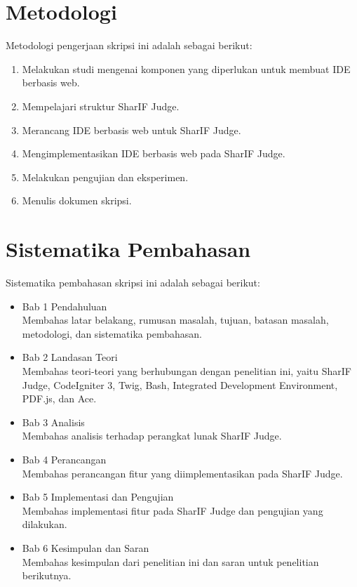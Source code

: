 \section{Metodologi}
\label{sec:metlit}
Metodologi pengerjaan skripsi ini adalah sebagai berikut:
\begin{enumerate}
	\item Melakukan studi mengenai komponen yang diperlukan untuk membuat IDE berbasis web.
	\item Mempelajari struktur SharIF Judge.
	\item Merancang IDE berbasis web untuk SharIF Judge.
	\item Mengimplementasikan IDE berbasis web pada SharIF Judge.
	\item Melakukan pengujian dan eksperimen.
	\item Menulis dokumen skripsi.
\end{enumerate}

\section{Sistematika Pembahasan}
\label{sec:sispem}
Sistematika pembahasan skripsi ini adalah sebagai berikut:
\begin{itemize}
	\item Bab 1 Pendahuluan \\ Membahas latar belakang, rumusan masalah, tujuan, batasan masalah, metodologi, dan sistematika pembahasan.
	\item Bab 2 Landasan Teori \\ Membahas teori-teori yang berhubungan dengan penelitian ini, yaitu SharIF Judge, CodeIgniter 3, Twig, Bash, Integrated Development Environment, PDF.js, dan Ace.
	\item Bab 3 Analisis \\ Membahas analisis terhadap perangkat lunak SharIF Judge.
	\item Bab 4 Perancangan \\ Membahas perancangan fitur yang diimplementasikan pada SharIF Judge.
	\item Bab 5 Implementasi dan Pengujian \\ Membahas implementasi fitur pada SharIF Judge dan pengujian yang dilakukan.
	\item Bab 6 Kesimpulan dan Saran \\ Membahas kesimpulan dari penelitian ini dan saran untuk penelitian berikutnya.
\end{itemize}
